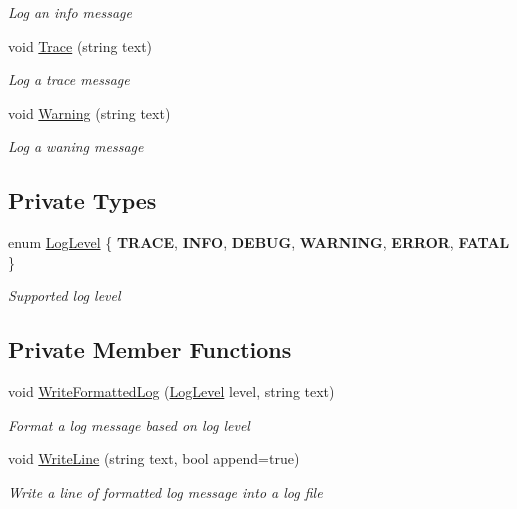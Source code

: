 \begin{DoxyCompactItemize}
\begin{DoxyCompactList}\small\item\em Log an info message \end{DoxyCompactList}\item 
void \hyperlink{class_coinche_1_1_tools_1_1_logger_a8526ceb1f73b054f8bfd867bfe29f7c4}{Trace} (string text)
\begin{DoxyCompactList}\small\item\em Log a trace message \end{DoxyCompactList}\item 
void \hyperlink{class_coinche_1_1_tools_1_1_logger_aa2fb274fdb25913f1f43f16f36d9873c}{Warning} (string text)
\begin{DoxyCompactList}\small\item\em Log a waning message \end{DoxyCompactList}\end{DoxyCompactItemize}
\subsection*{Private Types}
\begin{DoxyCompactItemize}
\item 
enum \hyperlink{class_coinche_1_1_tools_1_1_logger_a92fb562053cc0a63b44bd10d2fb7d929}{Log\+Level} \{ \newline
{\bfseries T\+R\+A\+CE}, 
{\bfseries I\+N\+FO}, 
{\bfseries D\+E\+B\+UG}, 
{\bfseries W\+A\+R\+N\+I\+NG}, 
\newline
{\bfseries E\+R\+R\+OR}, 
{\bfseries F\+A\+T\+AL}
 \}\begin{DoxyCompactList}\small\item\em Supported log level \end{DoxyCompactList}
\end{DoxyCompactItemize}
\subsection*{Private Member Functions}
\begin{DoxyCompactItemize}
\item 
void \hyperlink{class_coinche_1_1_tools_1_1_logger_abe673ff15df5c49450232baf995bb74a}{Write\+Formatted\+Log} (\hyperlink{class_coinche_1_1_tools_1_1_logger_a92fb562053cc0a63b44bd10d2fb7d929}{Log\+Level} level, string text)
\begin{DoxyCompactList}\small\item\em Format a log message based on log level \end{DoxyCompactList}\item 
void \hyperlink{class_coinche_1_1_tools_1_1_logger_a92c8eb1380a72b2ac5cee18aec78cce8}{Write\+Line} (string text, bool append=true)
\begin{DoxyCompactList}\small\item\em Write a line of formatted log message into a log file \end{DoxyCompactList}\end{DoxyCompactItemize}
